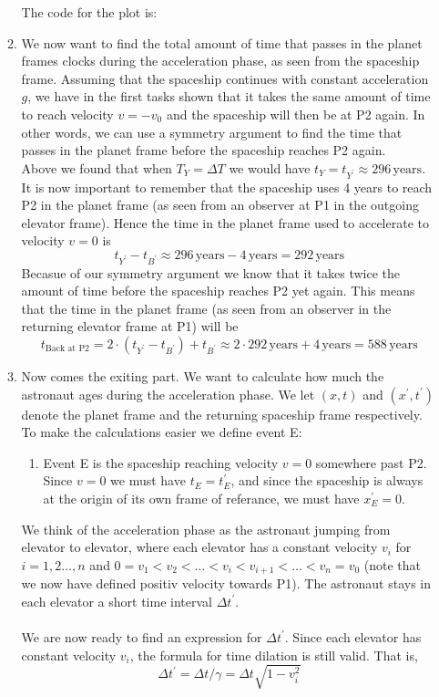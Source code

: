 \documentclass[a4paper,10pt,english]{article}
\begin{document}
\begin{enumerate}
\begin{enumerate}
The code for the plot is:


\item We now want to find the total amount of time that passes in the planet frames clocks during the acceleration phase, as seen from the spaceship frame. Assuming that the spaceship continues with constant acceleration $g$, we have in the first tasks shown that it takes the same amount of time to reach velocity $v=-v_{0}$ and the spaceship will then be at P2 again. In other words, we can use a symmetry argument to find the time that passes in the planet frame before the spaceship reaches P2 again. 
\\
Above we found that when $T_{Y}=\Delta T$ we would have $t_{Y}=t_{Y^{\prime}}\approx296\,\text{years}$. It is now important to remember that the spaceship uses 4 years to reach P2 in the planet frame (as seen from an observer at P1 in the outgoing elevator frame). Hence the time in the planet frame used to accelerate to velocity $v=0$ is \[t_{Y^{\prime}}-t_{B^{\prime}}\approx296\,\text{years}-4\,\text{years}=292\,\text{years}\]
Becasue of our symmetry argument we know that it takes twice the amount of time before the spaceship reaches P2 yet again. This means that the time in the planet frame (as seen from an observer in the returning elevator frame at P1) will be \[t_{\text{Back at P2}}=2\cdot(t_{Y^{\prime}}-t_{B^{\prime}})+t_{B^{\prime}}\approx2\cdot292\,\text{years}+4\,\text{years}=588\,\text{years}\]


\item Now comes the exiting part. We want to calculate how much the astronaut ages during the acceleration phase. We let $(x,t)$ and $(x^{\prime},t^{\prime})$ denote the planet frame and the returning spaceship frame respectively. To make the calculations easier we define event E:

\begin{enumerate} %
\item Event E is the spaceship reaching velocity $v=0$ somewhere past P2. Since $v=0$ we must have $t_{E}=t_{E}^{\prime}$, and since the spaceship is always at the origin of its own frame of referance, we must have $x_{E}^{\prime}=0$.
\end{enumerate} %

We think of the acceleration phase as the astronaut jumping from elevator to elevator, where each elevator has a constant velocity $v_{i}$ for $i=1,2\ldots,n$ and $0=v_{1}<v_{2}<\ldots<v_{i}<v_{i+1}<\ldots<v_{n}=v_{0}$ (note that we now have defined positiv velocity towards P1). The astronaut stays in each elevator a short time interval $\Delta t^{\prime}$. 
\\ \\
We are now ready to find an expression for $\Delta t^{\prime}$. Since each elevator has constant velocity $v_{i}$, the formula for time dilation is still valid. That is, 
\[\Delta t^{\prime}=\Delta t/\gamma=\Delta t\sqrt{1-v_{i}^{2}}\]


\end{enumerate}
\end{enumerate}
\end{document}
